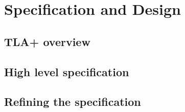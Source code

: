 
\chapter{Specification and Design} %

\label{Chapter 2} %

\section{TLA+ overview}

\section{High level specification}

\section{Refining the specification}

